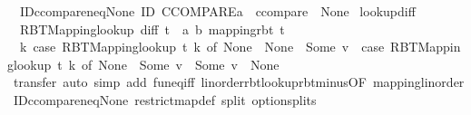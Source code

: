 \begin{isabellebody}
\endisatagproof
{\isafoldproof}%
%
\isadelimproof
\isanewline
%
\endisadelimproof
\isanewline
{}\isamarkupfalse%
\isanewline
\isanewline
{}\isamarkupfalse%
\ \ ID{\isacharunderscore}{\kern0pt}ccompare{\isacharunderscore}{\kern0pt}neq{\isacharunderscore}{\kern0pt}None{\isacharcolon}{\kern0pt}\ {\isachardoublequoteopen}ID\ CCOMPARE{\isacharparenleft}{\kern0pt}{\isacharprime}{\kern0pt}a\ {\isacharcolon}{\kern0pt}{\isacharcolon}{\kern0pt}\ ccompare{\isacharparenright}{\kern0pt}\ {\isasymnoteq}\ None{\isachardoublequoteclose}\isanewline
{}\isanewline
\isanewline
{}\isamarkupfalse%
\ lookup{\isacharunderscore}{\kern0pt}diff{\isacharcolon}{\kern0pt}\isanewline
\ \ {\isachardoublequoteopen}RBT{\isacharunderscore}{\kern0pt}Mapping{}{\isachardot}{\kern0pt}lookup\ {\isacharparenleft}{\kern0pt}diff\ {\isacharparenleft}{\kern0pt}t{}\ {\isacharcolon}{\kern0pt}{\isacharcolon}{\kern0pt}\ {\isacharparenleft}{\kern0pt}{\isacharprime}{\kern0pt}a{\isacharcomma}{\kern0pt}\ {\isacharprime}{\kern0pt}b{\isacharparenright}{\kern0pt}\ mapping{\isacharunderscore}{\kern0pt}rbt{\isacharparenright}{\kern0pt}\ t{}{\isacharparenright}{\kern0pt}\ {\isacharequal}{\kern0pt}\isanewline
\ \ {\isacharparenleft}{\kern0pt}{\isasymlambda}k{\isachardot}{\kern0pt}\ case\ RBT{\isacharunderscore}{\kern0pt}Mapping{}{\isachardot}{\kern0pt}lookup\ t{}\ k\ of\ None\ {\isasymRightarrow}\ None\ {\isacharbar}{\kern0pt}\ Some\ v{}\ {\isasymRightarrow}\ {\isacharparenleft}{\kern0pt}case\ RBT{\isacharunderscore}{\kern0pt}Mapping{}{\isachardot}{\kern0pt}lookup\ t{}\ k\ of\ None\ {\isasymRightarrow}\ Some\ v{}\ {\isacharbar}{\kern0pt}\ Some\ v{}\ {\isasymRightarrow}\ None{\isacharparenright}{\kern0pt}{\isacharparenright}{\kern0pt}{\isachardoublequoteclose}\isanewline
%
\isadelimproof
\ \ %
\endisadelimproof
%
\isatagproof
{}\isamarkupfalse%
\ transfer\ {\isacharparenleft}{\kern0pt}auto\ simp\ add{\isacharcolon}{\kern0pt}\ fun{\isacharunderscore}{\kern0pt}eq{\isacharunderscore}{\kern0pt}iff\ linorder{\isachardot}{\kern0pt}rbt{\isacharunderscore}{\kern0pt}lookup{\isacharunderscore}{\kern0pt}rbt{\isacharunderscore}{\kern0pt}minus{\isacharbrackleft}{\kern0pt}OF\ mapping{\isacharunderscore}{\kern0pt}linorder{\isacharbrackright}{\kern0pt}\ ID{\isacharunderscore}{\kern0pt}ccompare{\isacharunderscore}{\kern0pt}neq{\isacharunderscore}{\kern0pt}None\ restrict{\isacharunderscore}{\kern0pt}map{\isacharunderscore}{\kern0pt}def\ split{\isacharcolon}{\kern0pt}\ option{\isachardot}{\kern0pt}splits{\isacharparenright}{\kern0pt}%

\end{isabellebody}

